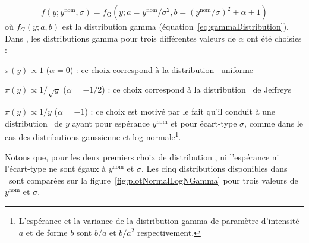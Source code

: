 \begin{equation}
\label{eq:gammaPriorsInOTH}
f\left(y;y^{\text{nom}},\sigma\right)=f_\text{G}\left(y;a=y^{\text{nom}}/\sigma^2,b=\left(y^{\text{nom}}/\sigma\right)^2+\alpha+1\right)
\end{equation}
o\`u $f_G\left(y;a,b\right)$ est la distribution gamma (\'equation~\ref{eq:gammaDistribution}). Dans \opthylic, les distributions gamma pour trois diff\'erentes valeurs de $\alpha$ ont \'et\'e choisies :
\begin{maliste}
\item $\pi\left(y\right)\propto 1$ ($\alpha=0$) : ce choix correspond \`a la distribution \prior~uniforme
\item $\pi\left(y\right)\propto 1/\sqrt{y}$ ($\alpha=-1/2$) : ce choix correspond \`a la distribution \prior~de Jeffreys
\item $\pi\left(y\right)\propto 1/y$ ($\alpha=-1$) : ce choix est motiv\'e par le fait qu'il conduit \`a une distribution \posterior~de $y$ ayant pour esp\'erance $y^{\text{nom}}$ et pour \'ecart-type $\sigma$, comme dans le cas des distributions gaussienne et log-normale\footnote{L'esp\'erance et la variance de la distribution gamma de param\`etre d'intensit\'e $a$ et de forme $b$ sont $b/a$ et $b/a^2$ respectivement.}.
\end{maliste}

Notons que, pour les deux premiers choix de distribution \prior, ni l'esp\'erance ni l'\'ecart-type ne sont \'egaux \`a $y^{\text{nom}}$ et $\sigma$. Les cinq distributions disponibles dans \opthylic~sont compar\'ees sur la figure~\ref{fig:plotNormalLogNGamma} pour trois valeurs de $y^{\text{nom}}$ et $\sigma$. 

